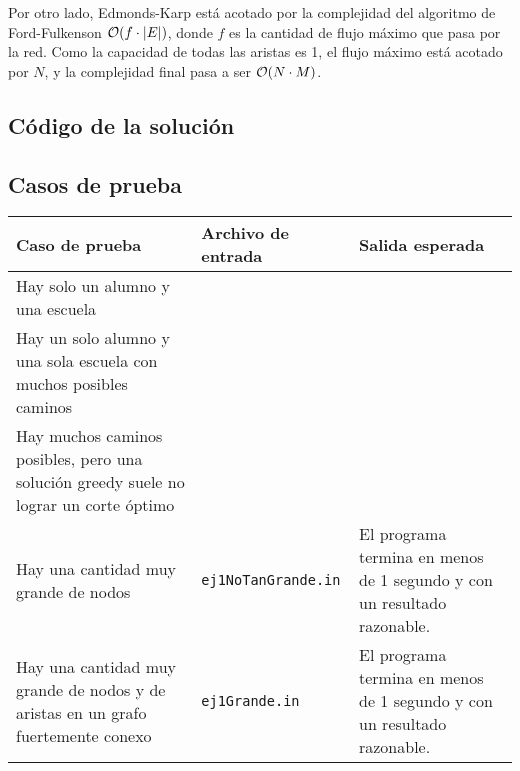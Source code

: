 Por otro lado, Edmonds-Karp está acotado por la complejidad del algoritmo de Ford-Fulkenson \(\mathcal{O}(f \cdot |E|)\), donde \(f\) es la cantidad de flujo máximo que pasa por la red\cite[\textit{theorem~26.8}]{cormen}. Como la capacidad de todas las aristas es 1, el flujo máximo está acotado por \(N\), y la complejidad final pasa a ser \(\mathcal{O}(N \cdot M)\).

\subsection{Código de la solución}


\newpage{}
\subsection{Casos de prueba}

\begin{tabulary}{\textwidth}{@{}|L|l|L|@{}}
\hline
\textbf{Caso de prueba} & \textbf{Archivo de entrada} & \textbf{Salida esperada} \\
\hline
Hay solo un alumno y una escuela &  &  \\ \hline
Hay un solo alumno y una sola escuela con muchos posibles caminos &  &  \\ \hline
Hay muchos caminos posibles, pero una solución greedy suele no lograr un corte óptimo &  &  \\ \hline
Hay una cantidad muy grande de nodos\footnotemark{} & \texttt{ej1NoTanGrande.in} & \scriptsize{El programa termina en menos de 1 segundo y con un resultado razonable.} \\ \hline
Hay una cantidad muy grande de nodos y de aristas en un grafo fuertemente conexo & \texttt{ej1Grande.in} & \scriptsize{El programa termina en menos de 1 segundo\footnotemark{} y con un resultado razonable.} \\ \hline
\end{tabulary}

